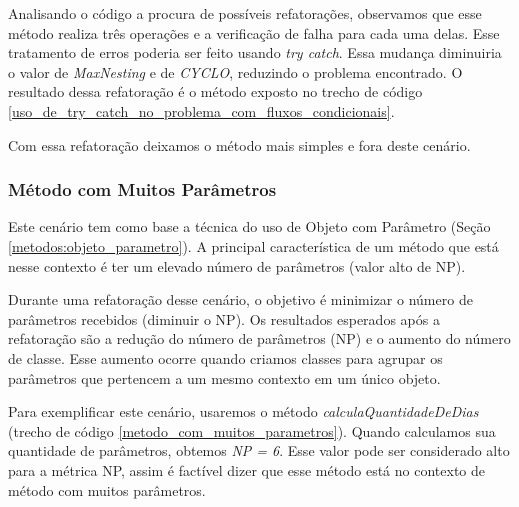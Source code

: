 Analisando o código a procura de possíveis refatorações, observamos que esse método realiza três operações e a verificação de falha para cada uma delas. Esse tratamento de erros poderia ser feito usando \textit{try catch}. Essa mudança diminuiria o valor de \textit{MaxNesting} e de \textit{CYCLO}, reduzindo o problema encontrado. O resultado dessa refatoração é o método exposto no trecho de código \ref{uso_de_try_catch_no_problema_com_fluxos_condicionais}.
                                                         

              
Com essa refatoração deixamos o método mais simples e fora deste cenário.


\subsubsection{Método com Muitos Parâmetros}
                                                                         
Este cenário tem como base a técnica do uso de Objeto com Parâmetro (Seção \ref{metodos:objeto_parametro}). A principal característica de um método que está nesse contexto é ter um elevado número de parâmetros (valor alto de NP).
                                                         
Durante uma refatoração desse cenário, o objetivo é minimizar o número de parâmetros recebidos (diminuir o NP). Os resultados esperados após a refatoração são a redução do número de parâmetros (NP) e o aumento do número de classe. Esse aumento ocorre quando criamos classes para agrupar os parâmetros que pertencem a um mesmo contexto em um único objeto.
	                                               
Para exemplificar este cenário, usaremos o método \textit{calculaQuantidadeDeDias} (trecho de código \ref{metodo_com_muitos_parametros}). Quando calculamos sua quantidade de parâmetros, obtemos \textit{NP = 6}. Esse valor pode ser considerado alto para a métrica NP, assim é factível dizer que esse método está no contexto de método com muitos parâmetros.                    	

                   
                                                                                                        
